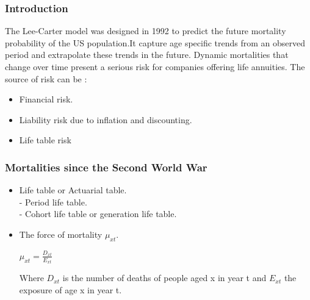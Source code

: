 \documentclass{beamer}
\begin{document}
\begin{frame}

\frametitle{Introduction}
  The Lee-Carter model was designed in 1992 to predict the future mortality  probability of the US population.It capture age specific trends from an observed period and extrapolate these trends in the future. Dynamic mortalities that change over time present a serious risk for companies offering life annuities. The source of risk can be :


  \begin{itemize}
  \item Financial risk.
  \item Liability risk due to inflation and discounting.
  \item Life table risk
  \end{itemize}

\end{frame}




\begin{frame}

\frametitle{Mortalities since the Second World War}

\begin{itemize}

\item  Life table or Actuarial table.\\
 - Period life table.\\
 - Cohort life table or generation life table.\\


\item  The force of mortality $\mu_{xt}$.

\vspace{5mm} \scalebox{1.5} {$\mu_{xt} = \frac {D_{xt}}{E_{xt}}$ }
\vspace{5mm} 

Where $D_{xt}$ is the number of deaths of people aged x in year t and $E_{xt}$ the exposure of age x in year t.

\end{itemize}
\end{frame}
\end{document}
